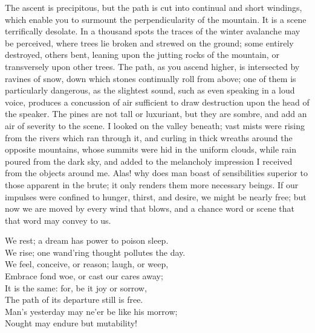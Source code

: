 The ascent is precipitous, but the
path is cut into continual and short
windings, which enable you to surmount
the perpendicularity of the
mountain. It is a scene terrifically
desolate. In a thousand spots the traces
of the winter avalanche may be perceived,
where trees lie broken and
strewed on the ground; some entirely
destroyed, others bent, leaning upon the
jutting rocks of the mountain, or transversely
upon other trees. The path, as
you ascend higher, is intersected by ravines
of snow, down which stones continually
roll from above; one of them
is particularly dangerous, as the slightest
sound, such as even speaking in a
loud voice, produces a concussion of
air sufficient to draw destruction upon
the head of the speaker. The pines
are not tall or luxuriant, but they are
sombre, and add an air of severity to
the scene. I looked on the valley beneath;
vast mists were rising from the
rivers which ran through it, and curling
in thick wreaths around the opposite
mountains, whose summits were
hid in the uniform clouds, while rain
poured from the dark sky, and added
to the melancholy impression I received
from the objects around me. Alas!
why does man boast of sensibilities superior
to those apparent in the brute;
it only renders them more necessary
beings. If our impulses were confined
to hunger, thirst, and desire, we might
be nearly free; but now we are moved
by every wind that blows, and a chance
word or scene that that word may convey
to us.

\vspace*{0.5em plus 3em}
{\noindent\small
\hspace*{1.5em}We rest; a dream has power to poison sleep.\\
\hspace*{2.5em} We rise; one wand'ring thought pollutes the day.\\
\hspace*{1.5em}We feel, conceive, or reason; laugh, or weep,\\
\hspace*{2.5em} Embrace fond woe, or cast our cares away;\\
\hspace*{1.5em}It is the same: for, be it joy or sorrow,\\
\hspace*{2.5em} The path of its departure still is free.\\
\hspace*{1.5em}Man's yesterday may ne'er be like his morrow;\\
\hspace*{2.5em} Nought may endure but mutability!}
\vspace{0.5em plus 1em}

